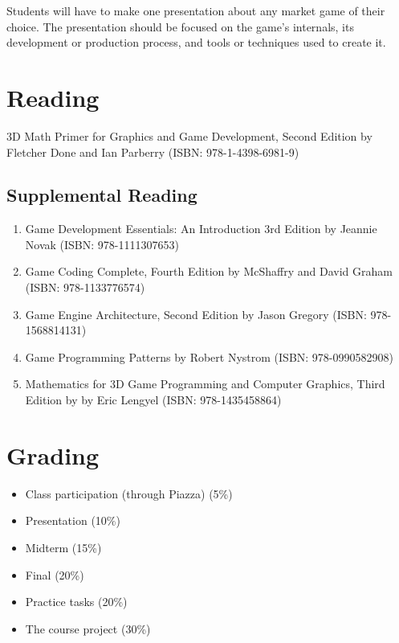 \documentclass[12pt,a4paper,oneside]{article}
\begin{document}
        Students will have to make one presentation about any market game of
        their choice. The presentation should be focused on the game's
        internals, its development or production process, and tools or
        techniques used to create it.

    \section{Reading}

        3D Math Primer for Graphics and Game Development, Second Edition by
        Fletcher Done and Ian Parberry (ISBN: 978-1-4398-6981-9)

        \subsection{Supplemental Reading}

            \begin{enumerate}
                \item Game Development Essentials: An Introduction 3rd Edition
                by Jeannie Novak (ISBN: 978-1111307653)
                \item Game Coding Complete, Fourth Edition by McShaffry and
                David Graham (ISBN: 978-1133776574)
                \item Game Engine Architecture, Second Edition by Jason Gregory
                (ISBN: 978-1568814131)
                \item Game Programming Patterns by Robert Nystrom (ISBN:
                978-0990582908)
                \item Mathematics for 3D Game Programming and Computer Graphics,
                Third Edition by by Eric Lengyel (ISBN: 978-1435458864)
            \end{enumerate}

    \section{Grading}

        \begin{itemize}
            \item Class participation (through Piazza) (5\%)
            \item Presentation (10\%)
            \item Midterm (15\%)
            \item Final (20\%)
            \item Practice tasks (20\%)
            \item The course project (30\%)
        \end{itemize}
\end{document}
